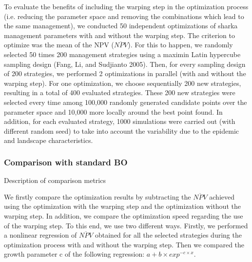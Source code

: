 
To evaluate the benefits of including the warping step in the optimization process (i.e. reducing the parameter space and removing the combinations which lead to the same management), we conducted 50 independent optimizations of sharka management parameters with and without the warping step. The criterion to optimize was the mean of the NPV ($\overline{NPV}$).
For this to happen, we randomly selected 50 times 200 management strategies using a maximin Latin hypercube sampling design (Fang, Li, and Sudjianto 2005). Then, for every sampling design of 200 strategies, we performed 2 optimizations in parallel (with and without the warping step). For one optimization, we choose sequentially 200 new strategies, resulting in a total of 400 evaluated strategies. These 200 new strategies were selected every time among 100,000 randomly generated candidate points over the parameter space and 10,000 more locally around the best point found. In addition, for each evaluated strategy, 1000 simulations were carried out (with different random seed) to take into account the variability due to the epidemic and landscape characteristics.


\subsubsection{Comparison with standard BO}

Description of comparison metrics



We firstly compare the optimization results by subtracting the $\overline{NPV}$ achieved using the optimization with the warping step and the optimization without the warping step. 
In addition, we compare the optimization speed regarding the use of the warping step. To this end, we use two different ways. Firstly, we performed a nonlinear regression of $\overline{NPV}$ obtained for all the selected strategies during the optimization process with and without the warping step. Then we compared the growth parameter c of the following regression:
$a+b \times exp^{-c\times x}$.

